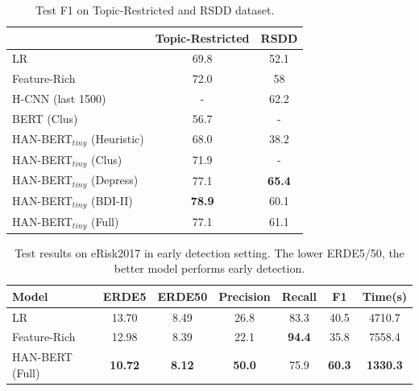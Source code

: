 \begin{table}[t]
    \centering
    \small
    \begin{tabular}{l|cc}
        \hline
        {} & Topic-Restricted & RSDD \\
        \hline
        LR & 69.8 & 52.1 \\
        Feature-Rich & 72.0 & 58 \\
        \hline
        H-CNN (last 1500) & - & 62.2 \\
        BERT (Clus) & 56.7 & - \\
        HAN-BERT$_{tiny}$ (Heuristic) & 68.0 & 38.2 \\
        HAN-BERT$_{tiny}$ (Clus) & 71.9 & - \\
        \hline
        HAN-BERT$_{tiny}$ (Depress) & 77.1 & \textbf{65.4} \\
        HAN-BERT$_{tiny}$ (BDI-II) & \textbf{78.9} & 60.1 \\
        HAN-BERT$_{tiny}$ (Full) & 77.1 & 61.1 \\
        \hline
    \end{tabular}
    \caption{\label{table:rsdd_wolohan} Test F1 on Topic-Restricted and RSDD dataset.}
\end{table}


\begin{table}[th]
    \centering
	\small
    \begin{tabular}{l|cccccc}
        \hline
        Model & ERDE5 & ERDE50 & Precision & Recall & F1 & Time(s) \\
        \hline
        LR & 13.70 & 8.49 & 26.8 & 83.3 & 40.5 & 4710.7 \\
        Feature-Rich & 12.98 & 8.39 & 22.1 & \textbf{94.4} & 35.8 & 7558.4 \\
        HAN-BERT (Full) & \textbf{10.72} & \textbf{8.12} & \textbf{50.0} & 75.9 & \textbf{60.3} & \textbf{1330.3} \\
        \hline
    \end{tabular}
    \caption{\label{table:early} Test results on eRisk2017 in early detection setting. The lower ERDE5/50, the better model performs early detection.}
\end{table}

